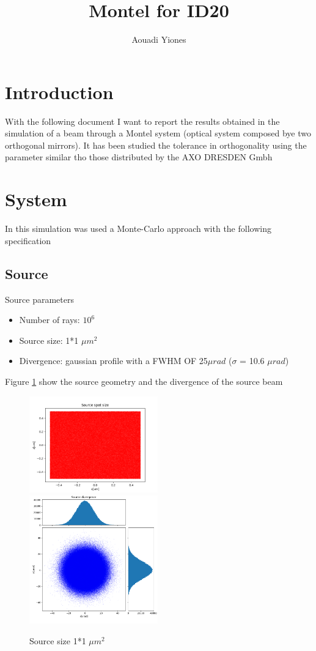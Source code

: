 \documentclass[a4paper]{article}
\title{Montel for ID20}
\author{Aouadi Yiones}
\begin{document}
\maketitle



\section{Introduction}
With the following document I want to report the results obtained in the simulation of a beam through a Montel system (optical system composed bye two orthogonal mirrors). It has been studied the tolerance in orthogonality using the parameter similar tho those distributed by the AXO DRESDEN Gmbh \cite{greenwade93}

\section{System}

In this simulation was used a Monte-Carlo approach with the following specification

\subsection{Source}

Source parameters
\begin{itemize}
\item Number of rays: $10^6$
\item Source size: 1*1 $\mu $$m^2$
\item Divergence: gaussian profile with a FWHM OF 25$\mu $$rad$ ($\sigma $ = 10.6 $\mu $$rad$)
\end{itemize}
Figure \ref{fig:beam at the source} show the source geometry and  the divergence of the source beam

\begin{figure}[H]
\centering
\includegraphics[width=0.495\textwidth]{Spot.png}
\includegraphics[width=0.495\textwidth]{Initial_divergence.png}
\caption{\label{fig:beam at the source}Source size 1*1 $\mu $$m^2$ }
\end{figure}
\end{document}
